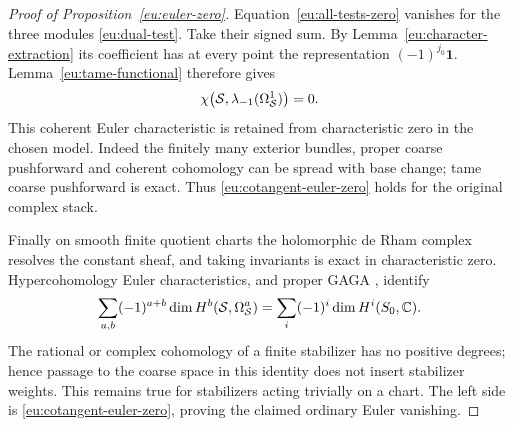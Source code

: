 \begin{proof}[Proof of Proposition~\ref{eu:euler-zero}]
Equation~\eqref{eu:all-tests-zero} vanishes for the three modules
\eqref{eu:dual-test}.  Take their signed sum.  By
Lemma~\ref{eu:character-extraction} its coefficient has at every
point the representation $(-1)^{j_0}\mathbf1$.
Lemma~\ref{eu:tame-functional} therefore gives
\begin{equation}\label{eu:cotangent-euler-zero}
                    \chi\bigl(\mathcal S,
                       \lambda_{-1}(\Omega^1_{\mathcal S})\bigr)=0.
\end{equation}
This coherent Euler characteristic is retained from characteristic
zero in the chosen model.  Indeed the finitely many exterior bundles,
proper coarse pushforward and coherent cohomology can be spread with
base change; tame coarse pushforward is exact.  Thus
\eqref{eu:cotangent-euler-zero} holds for the original complex stack.

Finally on smooth finite quotient charts the holomorphic de Rham
complex resolves the constant sheaf, and taking invariants is exact
in characteristic zero.  Hypercohomology Euler characteristics,
and proper GAGA \cite[Theorem~7.1]{PortaYu2016}, identify
\[
 \sum_{a,b}(-1)^{a+b}\dim H^b(\mathcal S,\Omega^a_{\mathcal S})
                     =\sum_i(-1)^i\dim H^i(S_0,\mathbb C).
\]
The rational or complex cohomology of a finite stabilizer has no
positive degrees; hence passage to the coarse space in this identity
does not insert stabilizer weights.  This remains true for stabilizers
acting trivially on a chart.  The left side is
\eqref{eu:cotangent-euler-zero}, proving the claimed ordinary
Euler vanishing.
\end{proof}
